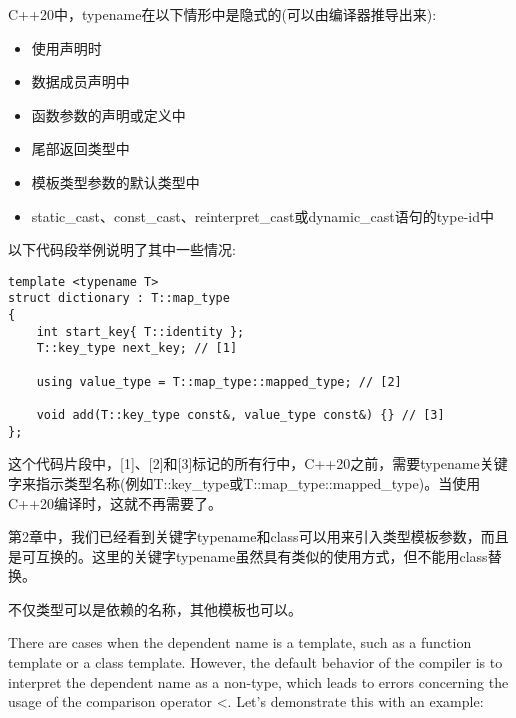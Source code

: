 C++20中，typename在以下情形中是隐式的(可以由编译器推导出来):

\begin{itemize}
\item
使用声明时

\item
数据成员声明中

\item
函数参数的声明或定义中

\item
尾部返回类型中

\item
模板类型参数的默认类型中

\item
static\_cast、const\_cast、reinterpret\_cast或dynamic\_cast语句的type-id中
\end{itemize}

以下代码段举例说明了其中一些情况:

\begin{lstlisting}[style=styleCXX]
template <typename T>
struct dictionary : T::map_type
{
	int start_key{ T::identity };
	T::key_type next_key; // [1]
	
	using value_type = T::map_type::mapped_type; // [2]
	
	void add(T::key_type const&, value_type const&) {} // [3]
};
\end{lstlisting}

这个代码片段中，[1]、[2]和[3]标记的所有行中，C++20之前，需要typename关键字来指示类型名称(例如T::key\_type或T::map\_type::mapped\_type)。当使用C++20编译时，这就不再需要了。

\begin{tcolorbox}[breakable,enhanced jigsaw,colback=blue!5!white,colframe=blue!75!black,title={Note}]
第2章中，我们已经看到关键字typename和class可以用来引入类型模板参数，而且是可互换的。这里的关键字typename虽然具有类似的使用方式，但不能用class替换。
\end{tcolorbox}

不仅类型可以是依赖的名称，其他模板也可以。


There are cases when the dependent name is a template, such as a function template or a class template. However, the default behavior of the compiler is to interpret the dependent name as a non-type, which leads to errors concerning the usage of the comparison operator <. Let’s demonstrate this with an example:

